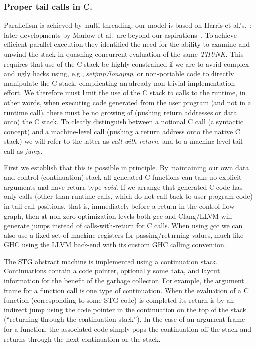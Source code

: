 \documentclass{llncs}
\begin{document}
\subsubsection{Proper tail calls in C.}
Parallelism is achieved by multi-threading; our model is based on Harris et
al.'s.~\cite{Harris:2005}; later developments by Marlow et al.\ are beyond our
aspirations~\cite{Marlow:2009,Marlow:2011}.  To achieve efficient parallel
execution they identified the need for the ability to examine and unwind the
stack in quashing concurrent evaluation of the same \emph{THUNK}\@.  This
requires that use of the C stack be highly constrained if we are to avoid
complex and ugly hacks using, e.g., \emph{setjmp/longjmp}, or non-portable
code to directly manipulate the C stack, complicating an already non-trivial
implementation effort.  We therefore must limit the use of the C stack to
calls to the runtime, in other words, when executing code generated from the
user program (and not in a runtime call), there must be no growing of (pushing
return addresses or data onto) the C stack.
%
To clearly distinguish between a notional C call (a syntactic concept) and a
machine-level call (pushing a return address onto the native C stack) we will
refer to the latter as \emph{call-with-return}, and to a machine-level tail
call as \emph{jump}.

First we establish that this is possible in principle.  By maintaining our own
data and control (continuation) stack all generated C functions can take no
explicit arguments and have return type \emph{void}. If we arrange that
generated C code has only calls (other than runtime calls, which do not call
back to user-program code) in tail call positions, that is, immediately before
a return in the control flow graph, then at non-zero optimization levels both
gcc and Clang/LLVM will generate jumps instead of calls-with-return for C
calls.  When using gcc we can also use a fixed set of machine registers for
passing/returning values, much like GHC using the LLVM back-end with its
custom GHC calling convention.


The STG abstract machine is implemented using a continuation stack.
Continuations contain a code pointer, optionally some data, and layout
information for the benefit of the garbage collector.  For example, the
argument frame for a function call is one type of continuation.  When the
evaluation of a C function (corresponding to some STG code) is completed its
return is by an indirect jump using the code pointer in the continuation on
the top of the stack (``returning through the continuation stack'').  In the
case of an argument frame for a function, the associated code simply pops the
continuation off the stack and returns through the next continuation on the
stack.
\end{document}
